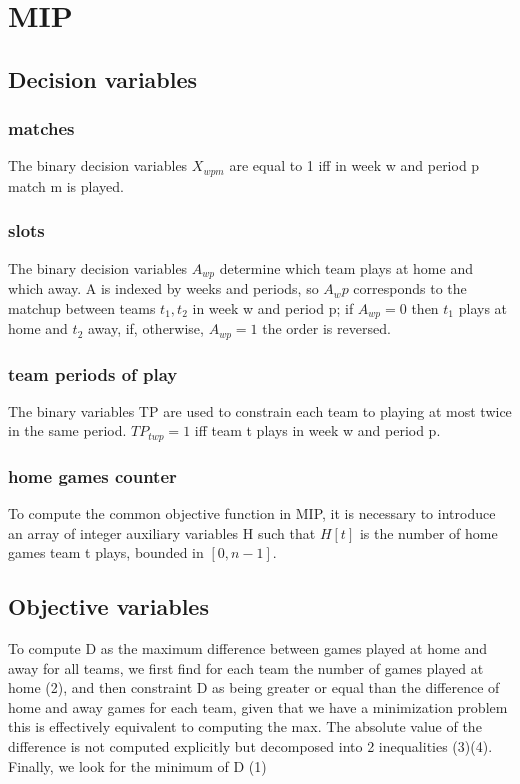 \section{MIP}
\subsection{Decision variables}
\subsubsection{matches}
The binary decision variables $X_{wpm}$ are equal to 1 iff in week w and period p match m is played.

\subsubsection{slots}
The binary decision variables $A_{wp}$ determine which team plays at home and which away. A is indexed by weeks and periods, so $A_wp$ corresponds to the matchup between teams $t_1, t_2$ in week w and period p; if $A_{wp} = 0$ then $t_1$ plays at home and $t_2$ away, if, otherwise, $A_{wp} = 1$ the order is reversed.

\subsubsection{team periods of play}
The binary variables TP are used to constrain each team to playing at most twice in the same period. $TP_{twp} = 1$ iff team t plays in week w and period p. 

\subsubsection{home games counter}
To compute the common objective function in MIP, it is necessary to introduce an array of integer auxiliary variables H such that $H[t]$ is the number of home games team t plays, bounded in $[0, n-1]$.

\subsection{Objective variables}
To compute D as the maximum difference between games played at home and away for all teams, we first find for each team the number of games played at home (2), and then constraint D as being greater or equal than the difference of home and away games for each team, given that we have a minimization problem this is effectively equivalent to computing the max. The absolute value of the difference is not computed explicitly but decomposed into 2 inequalities (3)(4). Finally, we look for the minimum of D (1)

